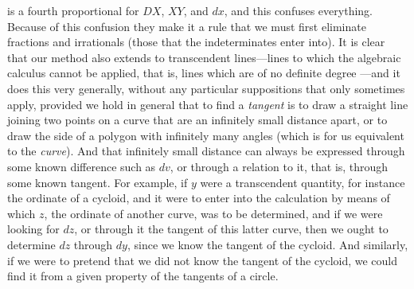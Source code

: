 \documentclass[polutonikogreek,english,twoside,openright]{article}
\begin{document}
is a fourth proportional for $DX$, $XY$, and $dx$, and this confuses
everything.  Because of this confusion they make it a rule that we
must first eliminate fractions and irrationals (those that the
indeterminates enter into).  It is clear that our method also extends
to transcendent lines---lines to which the algebraic calculus cannot
be applied, that is, lines which are of no definite
degree \label{trandef}---and it
does this very generally, without any particular suppositions that
only sometimes apply, provided we hold in general that to find a {\em
  tangent} is to draw a straight line joining two points on a curve
that are an infinitely small distance apart\label{taninfcl}, or to
draw the side of a polygon with infinitely many angles (which is for
us equivalent to the {\em curve}).  And that infinitely small distance
can always be expressed through some known difference such as $dv$, or
through a relation to it, that is, through some known tangent.  For
example, if $y$ were a transcendent quantity, for instance the
ordinate of a cycloid, and it were to enter into the calculation by
means of which $z$, the ordinate of another curve, was to be
determined, and if we were looking for $dz$, or through it the tangent
of this latter curve, then we ought to determine $dz$ through $dy$,
since we know the tangent of the cycloid.  And similarly, if we were
to pretend that we did not know the tangent of the cycloid, we could
find it from a given property of the tangents of a
circle.
\end{document}
